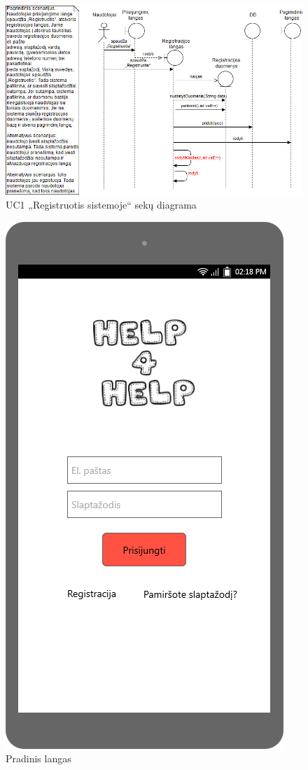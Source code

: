 \documentclass{VUMIFPSbakalaurinis}
\begin{document}
\begin{figure}[H]
	\centering
	\includegraphics[scale=0.6]{img/Sequence/1sequence}
	\caption{UC1 „Registruotis sistemoje“ sekų diagrama}
	\label{img:uc1seq}
\end{figure}

\begin{figure}[H]
	\centering
	\includegraphics[scale=0.4]{img/ScreenShots/01-Pradinis-langas}
	\caption{Pradinis langas}
	\label{img:login}
\end{figure}
\end{document}
